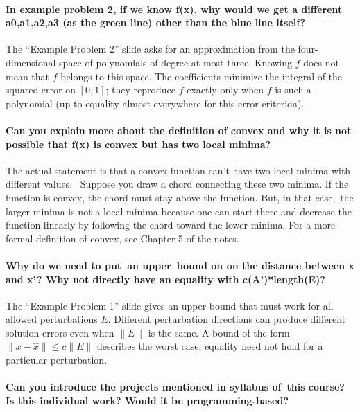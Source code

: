 \documentclass[10pt,english]{article}
\begin{document}
\paragraph{In example problem 2, if we know f(x), why would we get a different a0,a1,a2,a3 (as the green line) other than the blue line itself?}


The ``Example Problem 2'' slide asks for an approximation from the four-dimensional space of polynomials of degree at most three.
Knowing $f$ does not mean that $f$ belongs to this space.
The coefficients minimize the integral of the squared error on $[0,1]$; they reproduce $f$ exactly only when $f$ is such a polynomial (up to equality almost everywhere for this error criterion).


\paragraph{Can you explain more about the definition of convex and why it is not possible that f(x) is convex but has two local minima?}

The actual statement is that a convex function can't have two local minima with different values.  Suppose you draw a chord connecting these two minima.  If the function is convex, the chord must stay above the function.
But, in that case, the larger minima is not a local minima because one can start there and decrease the function linearly by following the chord toward the lower minima.  For a more formal definition of convex, see Chapter 5 of the notes.


\paragraph{Why do we need to put an upper bound on on the distance between x and x'? Why not directly have an equality with c(A')*length(E)?}


The ``Example Problem 1'' slide gives an upper bound that must work for all allowed perturbations $E$.
Different perturbation directions can produce different solution errors even when $\|E\|$ is the same.
A bound of the form $\|x-\hat{x}\|\leq c\|E\|$ describes the worst case; equality need not hold for a particular perturbation.


\paragraph{Can you introduce the projects mentioned in syllabus of this course? Is this individual work? Would it be programming-based?}
\end{document}
